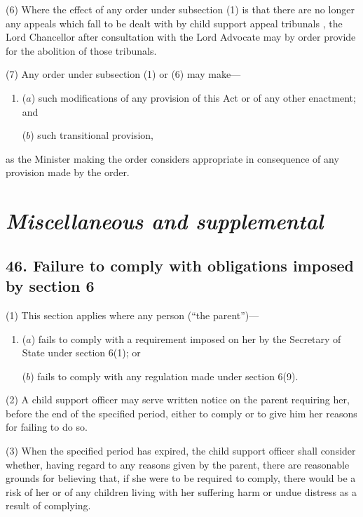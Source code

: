 \documentclass[12pt,a4paper]{article}
\begin{document}
(6) Where the effect of any order under subsection (1)  is that there are no longer any appeals which fall to be dealt with by 
child support appeal tribunals%
, the Lord Chancellor after consultation with the Lord Advocate may by order provide for the abolition of those tribunals.

(7) Any order under subsection (1)  or (6)  may make—
\begin{enumerate}\item[]
($a$) such modifications of any provision of this Act or of any other enactment; and

($b$) such transitional provision,
\end{enumerate}
as the Minister making the order considers appropriate in consequence of any provision made by the order.


\section{\itshape Miscellaneous and supplemental}

\subsection{46. Failure to comply with obligations imposed by section 6}

(1) This section applies where any person (“the parent”)—
\begin{enumerate}\item[]
($a$) fails to comply with a requirement imposed on her by the Secretary of State under section 6(1); or

($b$) fails to comply with any regulation made under section 6(9).
\end{enumerate}

(2) 
A child support officer 
may serve written notice on the parent requiring her, before the end of the specified period, either to comply or to give him her reasons for failing to do so.

(3) When the specified period has expired, 
the child support officer 
shall consider whether, having regard to any reasons given by the parent, there are reasonable grounds for believing that, if she were to be required to comply, there would be a risk of her or of any children living with her suffering harm or undue distress as a result of complying.
\end{document}
